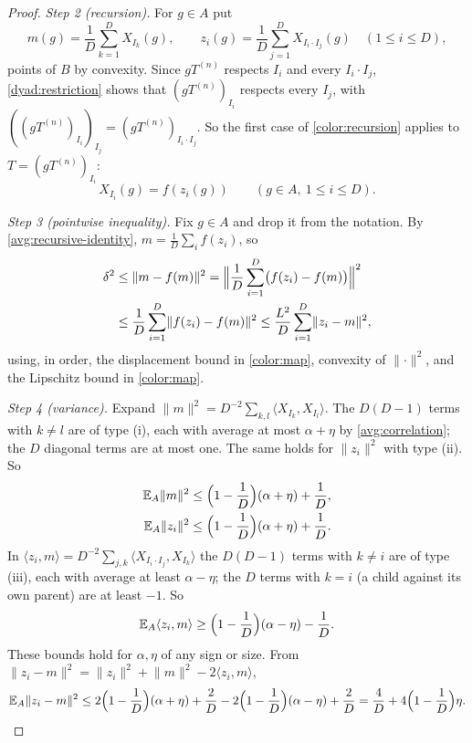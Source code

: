 \documentclass[11pt]{article}
\newcommand{\norm}[1]{\lVert #1\rVert}
\newcommand{\ip}[2]{\langle #1,#2\rangle}
\theoremstyle{definition}
\numberwithin{equation}{section}
\begin{document}
\begin{proof}
\emph{Step 2 (recursion).} For $g\in A$ put
\[
  m(g)=\frac1D\sum_{k=1}^DX_{I_k}(g),\qquad
  z_i(g)=\frac1D\sum_{j=1}^DX_{I_i\cdot I_j}(g)\quad(1\leq i\leq D),
\]
points of $B$ by convexity. Since $gT^{(n)}$ respects $I_i$ and every
$I_i\cdot I_j$, \eqref{dyad:restriction} shows that
$(gT^{(n)})_{I_i}$ respects every $I_j$, with
$((gT^{(n)})_{I_i})_{I_j}=(gT^{(n)})_{I_i\cdot I_j}$. So the first case
of \eqref{color:recursion} applies to $T=(gT^{(n)})_{I_i}$:
\begin{equation}\label{avg:recursive-identity}
  X_{I_i}(g)=f(z_i(g))\qquad(g\in A,\ 1\leq i\leq D).
\end{equation}

\emph{Step 3 (pointwise inequality).} Fix $g\in A$ and drop it from the
notation. By \eqref{avg:recursive-identity}, $m=\frac1D\sum_if(z_i)$, so
\begin{align}
  \delta^2&\leq\norm{m-f(m)}^2
   =\Bigl\|\frac1D\sum_{i=1}^D\bigl(f(z_i)-f(m)\bigr)\Bigr\|^2\notag\\
  &\leq\frac1D\sum_{i=1}^D\norm{f(z_i)-f(m)}^2
   \leq\frac{L^2}{D}\sum_{i=1}^D\norm{z_i-m}^2,
       \label{avg:displacement}
\end{align}
using, in order, the displacement bound in \eqref{color:map}, convexity
of $\norm{\cdot}^2$, and the Lipschitz bound in \eqref{color:map}.

\emph{Step 4 (variance).} Expand
$\norm{m}^2=D^{-2}\sum_{k,l}\ip{X_{I_k}}{X_{I_l}}$. The $D(D-1)$ terms
with $k\ne l$ are of type (i), each with average at most $\alpha+\eta$
by \eqref{avg:correlation}; the $D$ diagonal terms are at most one.
The same holds for $\norm{z_i}^2$ with type (ii). So
\begin{align}
  \mathbb E_A\norm{m}^2
       &\leq\Bigl(1-\frac1D\Bigr)(\alpha+\eta)+\frac1D,
       \label{avg:parent-bound}\\
  \mathbb E_A\norm{z_i}^2
       &\leq\Bigl(1-\frac1D\Bigr)(\alpha+\eta)+\frac1D.
       \label{avg:child-bound}
\end{align}
In
$\ip{z_i}{m}=D^{-2}\sum_{j,k}\ip{X_{I_i\cdot I_j}}{X_{I_k}}$ the
$D(D-1)$ terms with $k\ne i$ are of type (iii), each with average at
least $\alpha-\eta$; the $D$ terms with $k=i$ (a child against its own
parent) are at least $-1$. So
\begin{equation}\label{avg:mixed-bound}
  \mathbb E_A\ip{z_i}{m}
    \geq\Bigl(1-\frac1D\Bigr)(\alpha-\eta)-\frac1D.
\end{equation}
These bounds hold for $\alpha,\eta$ of any sign or size. From
$\norm{z_i-m}^2=\norm{z_i}^2+\norm{m}^2-2\ip{z_i}{m}$,
\begin{equation}\label{avg:variance}
  \mathbb E_A\norm{z_i-m}^2
   \le2\Bigl(1-\frac1D\Bigr)(\alpha+\eta)+\frac2D
      -2\Bigl(1-\frac1D\Bigr)(\alpha-\eta)+\frac2D
   =\frac4D+4\Bigl(1-\frac1D\Bigr)\eta .
\end{equation}


\end{proof}
\end{document}
